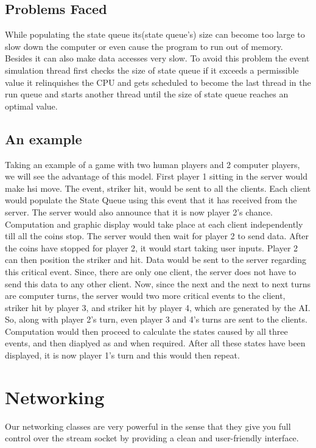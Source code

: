 \documentclass[11pt,a4paper,oneside]{report}
\begin{document}
\subsection{Problems Faced}
While populating the state queue its(state queue's) size can become too large to slow down the computer or even cause the program to run out of memory. Besides it can also make data accesses very slow. To avoid this problem the event simulation thread first checks the size of state queue if it exceeds a permissible value it relinquishes the CPU and gets scheduled to become the last thread in the run queue and starts another thread until the size of state queue reaches an optimal value.

\subsection{An example}
Taking an example of a game with two human players and 2 computer players, we will see the advantage of this model. First player 1 sitting in the server would make hsi move. The event, striker hit, would be sent to all the clients. Each client would populate the State Queue using this event that it has received from the server. The server would also announce that it is now player 2's chance. Computation and graphic display would take place at each client independently till all the coins stop. The server would then wait for player 2 to send data. After the coins have stopped for player 2, it would start taking user inputs. Player 2 can then position the striker and hit. Data would be sent to the server regarding this critical event. Since, there are only one client, the server does not have to send this data to any other client. Now, since the next and the next to next turns are computer turns, the server would two more critical events to the client, striker hit by player 3, and striker hit by player 4, which are generated by the AI. So, along with player 2's turn, even player 3 and 4's turns are sent to the clients. Computation would then proceed to calculate the states caused by all three events, and then diaplyed as and when required. After all these states have been displayed, it is now player 1's turn and this would then repeat. 

\section{Networking}
Our networking classes are very powerful in the sense that they give you full control over the stream socket by providing a clean and user-friendly interface.
\end{document}
